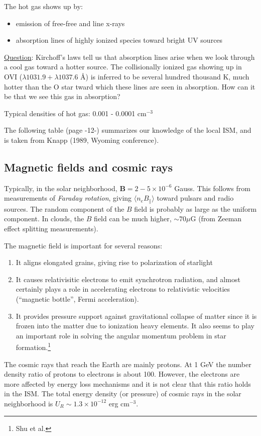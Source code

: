\documentclass[11pt]{article}
\newcommand{\mar}[1]{\hspace{0pt}\marginpar{-\textcolor{black}{#1}-}}
\begin{document}
The hot gas shows up by:
\begin{itemize}
    \item emission of free-free and line x-rays
    \item absorption lines of highly ionized species toward bright UV sources
\end{itemize}

\underline{Question}: Kirchoff's laws tell us that absorption lines arise when
we look through a cool gas toward a hotter source. The collisionally ionized gas
showing up in OVI ($\lambda 1031.9 + \lambda 1037.6$ \AA{}) is inferred to be
several hundred thousand K, much hotter than the O star tward which these lines
are seen in absorption. How can it be that we see this gas in absorption?

Typical densities of hot gas: 0.001 - 0.0001 cm$^{-3}$

The following table (page -12-) summarizes our knowledge of the local ISM, and
is taken from Knapp (1989, Wyoming conference).

\subsection{Magnetic fields and cosmic rays}
\mar{13}Typically, in the solar neighborhood,
$\mathbf{B} = 2\!-\!5\times10^{-6}$ Gauss.
This follows from measurements of \textit{Faraday rotation}, giving
$\langle n_{e}B_{\parallel} \rangle$
toward pulsars and radio sources. The random component of the $B$ field is
probably as large as the uniform component. In clouds, the $B$ field can be
much higher, $\sim 70 \mu$G (from Zeeman effect splitting measurements).

The magnetic field is important for several reasons:
\begin{enumerate}
    \item It aligns elongated grains, giving rise to polarization
        of starlight
    \item It causes relativisitic electrons to emit synchrotron radiation,
        and almost certainly plays a role in accelerating electrons to
        relativistic velocities (``magnetic bottle'', Fermi acceleration).
    \item It provides pressure support against gravitational collapse of matter
        since it is frozen into the matter due to ionization heavy elements.
        It also seems to play an important role in solving the angular momentum
        problem in star formation.\footnote{Shu et al.}
\end{enumerate}
The cosmic rays that reach the Earth are mainly protons. At 1 GeV the number
density ratio of protons to electrons is about 100. However, the electrons
are more affected by energy loss mechanisms and it is not clear that this
ratio holds in the ISM. The total energy density (or pressure) of cosmic
rays in the solar neighborhood is
$U_{R} \sim 1.3\times10^{-12}$ erg cm$^{-3}$.
\end{document}
